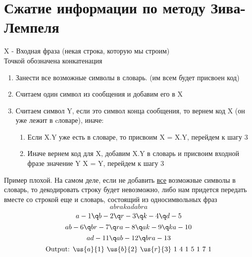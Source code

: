 \documentclass[discrete.tex]{subfiles}
\begin{document}
  \section{Сжатие информации по методу Зива-Лемпеля}

  \begin{alg}
      X - Входная фраза (некая строка, которую мы строим)\\
      Точкой обозначена конкатенация
      \begin{enumerate}
          \item Занести все возможные символы в словарь. (им всем будет присвоен код)
          \item Считаем один символ из сообщения и добавим его в X
          \item Считаем символ Y, если это символ конца сообщения, то вернем код X (он уже
              лежит в cловаре), иначе:
              \begin{enumerate}
                  \item Если X.Y уже есть в словаре, то присвоим X = X.Y, перейдем к шагу 3
                  \item Иначе вернем код для X, добавим X.Y в словарь и присвоим входной
                      фразе значение Y \q X = Y, перейдем к шагу 3
              \end{enumerate}
      \end{enumerate}
  \end{alg}

  \begin{example}
      Пример плохой. На самом деле, если не добавить \ul{все}
      возможные символы в словарь, то декодировать строку будет невозможно, либо нам придется передать вместе со строкой еще и словарь, состоящий из односимвольных фраз
      \[abrakadabra\]
      \[a - 1 \q b - 2 \q r - 3 \q k - 4 \q d - 5\]
      \[ab - 6 \q br - 7 \q ra - 8 \q ak - 9 \q ka - 10\]
      \[ad - 11 \q ab - 12 \q bra - 13\]
      \[\text{Output: } \us{a}{1} \ \us{b}{2} \ \us{r}{3} \ 1 \ 4 \ 1 \ 5 \ 1 \ 7 \ 1\]
  \end{example}
\end{document}
